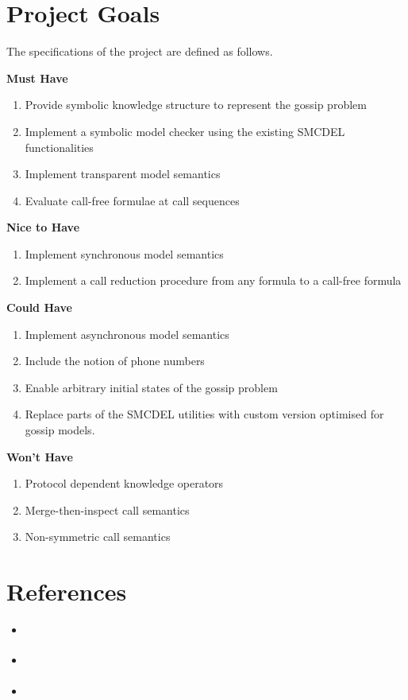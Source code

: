 \documentclass[12pt,a4paper]{article}
\begin{document}
\section{Project Goals}
The specifications of the project are defined as follows.

\textbf{Must Have}
\begin{enumerate}
    \item Provide symbolic knowledge structure to represent the gossip problem
    \item Implement a symbolic model checker using the existing SMCDEL functionalities
    \item Implement transparent model semantics
    \item Evaluate call-free formulae at call sequences
\end{enumerate}

\textbf{Nice to Have}
\begin{enumerate}
    \item Implement synchronous model semantics
    \item Implement a call reduction procedure from any formula to a call-free formula
\end{enumerate}

\textbf{Could Have}
\begin{enumerate}
    \item Implement asynchronous model semantics
    \item Include the notion of phone numbers
    \item Enable arbitrary initial states of the gossip problem
    \item Replace parts of the SMCDEL utilities with custom version optimised for gossip models.
\end{enumerate}

\textbf{Won't Have}
\begin{enumerate}
    \item Protocol dependent knowledge operators
    \item Merge-then-inspect call semantics
    \item Non-symmetric call semantics
\end{enumerate}

\section*{References}
\begin{itemize}
    \item \cite{gattinger2023gomoche}
    \item \cite{vanditmarsch2019strengthening}
    \item \cite{GattingerThesis2018}
\end{itemize}



\end{document}
